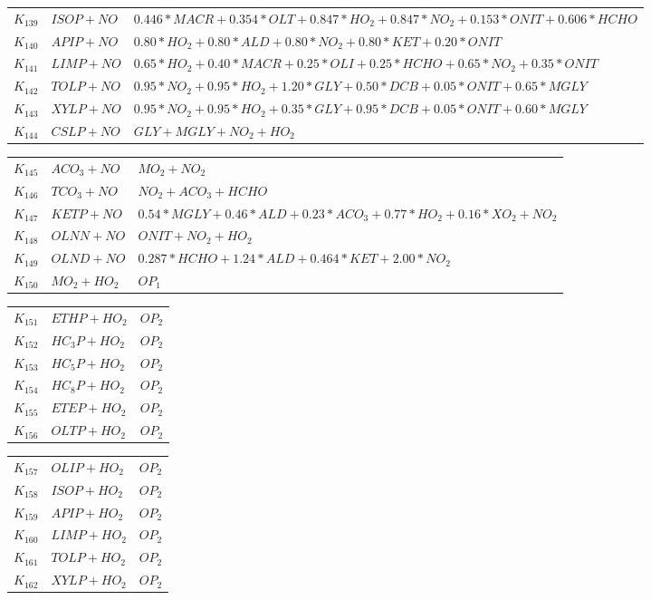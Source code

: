 {\begin{tabular}{l@{\,:\,}p{0.2\chfwidth}@{$\quad\longrightarrow\quad$}p{0.6\chfwidth}}
$K_{139}$ & $ISOP+NO$ & $0.446*MACR+0.354*OLT+0.847*HO_{2}+0.847*NO_{2}+0.153*ONIT+0.606*HCHO$ \\
$K_{140}$ & $APIP+NO$ & $0.80*HO_{2}+0.80*ALD+0.80*NO_{2}+0.80*KET+0.20*ONIT$ \\
$K_{141}$ & $LIMP+NO$ & $0.65*HO_{2}+0.40*MACR+0.25*OLI+0.25*HCHO+0.65*NO_{2}+0.35*ONIT$ \\
$K_{142}$ & $TOLP+NO$ & $0.95*NO_{2}+0.95*HO_{2}+1.20*GLY+0.50*DCB+0.05*ONIT+0.65*MGLY$ \\
$K_{143}$ & $XYLP+NO$ & $0.95*NO_{2}+0.95*HO_{2}+0.35*GLY+0.95*DCB+0.05*ONIT+0.60*MGLY$ \\
$K_{144}$ & $CSLP+NO$ & $GLY+MGLY+NO_{2}+HO_{2}$ \\
\end{tabular}

\begin{tabular}{l@{\,:\,}p{0.2\chfwidth}@{$\quad\longrightarrow\quad$}p{0.6\chfwidth}}
$K_{145}$ & $ACO_{3}+NO$ & $MO_{2}+NO_{2}$ \\
$K_{146}$ & $TCO_{3}+NO$ & $NO_{2}+ACO_{3}+HCHO$ \\
$K_{147}$ & $KETP+NO$ & $0.54*MGLY+0.46*ALD+0.23*ACO_{3}+0.77*HO_{2}+0.16*XO_{2}+NO_{2}$ \\
$K_{148}$ & $OLNN+NO$ & $ONIT+NO_{2}+HO_{2}$ \\
$K_{149}$ & $OLND+NO$ & $0.287*HCHO+1.24*ALD+0.464*KET+2.00*NO_{2}$ \\
$K_{150}$ & $MO_{2}+HO_{2}$ & $OP_{1}$ \\
\end{tabular}

\begin{tabular}{l@{\,:\,}p{0.2\chfwidth}@{$\quad\longrightarrow\quad$}p{0.6\chfwidth}}
$K_{151}$ & $ETHP+HO_{2}$ & $OP_{2}$ \\
$K_{152}$ & $HC_{3}P+HO_{2}$ & $OP_{2}$ \\
$K_{153}$ & $HC_{5}P+HO_{2}$ & $OP_{2}$ \\
$K_{154}$ & $HC_{8}P+HO_{2}$ & $OP_{2}$ \\
$K_{155}$ & $ETEP+HO_{2}$ & $OP_{2}$ \\
$K_{156}$ & $OLTP+HO_{2}$ & $OP_{2}$ \\
\end{tabular}

\begin{tabular}{l@{\,:\,}p{0.2\chfwidth}@{$\quad\longrightarrow\quad$}p{0.6\chfwidth}}
$K_{157}$ & $OLIP+HO_{2}$ & $OP_{2}$ \\
$K_{158}$ & $ISOP+HO_{2}$ & $OP_{2}$ \\
$K_{159}$ & $APIP+HO_{2}$ & $OP_{2}$ \\
$K_{160}$ & $LIMP+HO_{2}$ & $OP_{2}$ \\
$K_{161}$ & $TOLP+HO_{2}$ & $OP_{2}$ \\
$K_{162}$ & $XYLP+HO_{2}$ & $OP_{2}$ \\
\end{tabular}

}
